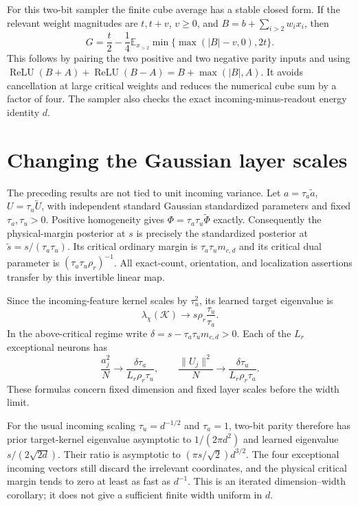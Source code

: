 \documentclass[11pt]{article}
\newcommand{\E}{\mathbb E}\newcommand{\R}{\mathbb R}
\newcommand{\relu}{\operatorname{ReLU}}
\begin{document}
For this two-bit sampler the finite cube average has a stable closed
form. If the relevant weight magnitudes are $t,t+v$, $v\ge0$, and
$B=b+\sum_{i>2}w_ix_i$, then
\[
 G=\frac t2-\frac14\E_{x_{>2}}
                 \min\{\max(|B|-v,0),2t\}.
\]
This follows by pairing the two positive and two negative parity inputs
and using $\relu(B+A)+\relu(B-A)=B+\max(|B|,A)$.
It avoids cancellation at large critical weights and reduces the
numerical cube sum by a factor of four. The sampler also checks the exact
incoming-minus-readout energy identity $d$.
\section{Changing the Gaussian layer scales}
The preceding results are not tied to unit incoming variance. Let
$a=\tau_a\widetilde a$, $U=\tau_u\widetilde U$, with independent
standard Gaussian standardized parameters and fixed $\tau_a,\tau_u>0$.
Positive homogeneity gives $\Phi=\tau_a\tau_u\widetilde\Phi$ exactly.
Consequently the physical-margin posterior at $s$ is precisely the
standardized posterior at $\widetilde s=s/(\tau_a\tau_u)$. Its critical
ordinary margin is $\tau_a\tau_u m_{c,d}$ and its critical dual parameter
is $(\tau_a\tau_u\rho_r)^{-1}$. All exact-count, orientation, and
localization assertions transfer by this invertible linear map.

Since the incoming-feature kernel scales by $\tau_u^2$, its learned
target eigenvalue is
\[
            \lambda_\chi(\mathcal K)\longrightarrow
                        s\rho_r\frac{\tau_u}{\tau_a}.
\]
In the above-critical regime write
$\delta=s-\tau_a\tau_u m_{c,d}>0$. Each of the $L_r$ exceptional
neurons has
\[
 \frac{a_j^2}{N}\longrightarrow
       \frac{\delta\tau_a}{L_r\rho_r\tau_u},\qquad
 \frac{\|U_j\|^2}{N}\longrightarrow
       \frac{\delta\tau_u}{L_r\rho_r\tau_a}.
\]
These formulas concern fixed dimension and fixed layer scales before
the width limit.

For the usual incoming scaling $\tau_u=d^{-1/2}$ and $\tau_a=1$,
two-bit parity therefore has prior target-kernel eigenvalue asymptotic
to $1/(2\pi d^2)$ and learned eigenvalue $s/(2\sqrt{2d})$.
Their ratio is asymptotic to $(\pi s/\sqrt2)d^{3/2}$.
The four exceptional incoming vectors still discard the irrelevant
coordinates, and the physical critical margin tends to zero at least
as fast as $d^{-1}$. This is an iterated dimension--width corollary;
it does not give a sufficient finite width uniform in $d$.
\end{document}
